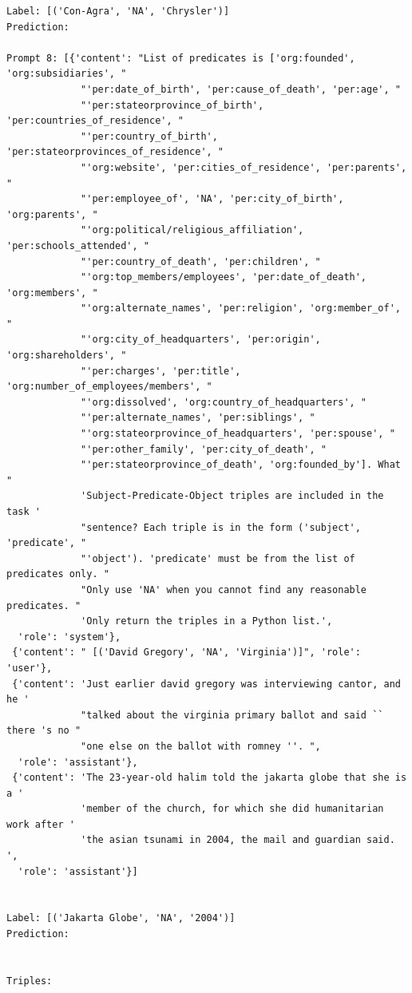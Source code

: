 \documentclass{article}
\begin{document}
\begin{lstlisting}
Label: [('Con-Agra', 'NA', 'Chrysler')]
Prediction: 

Prompt 8: [{'content': "List of predicates is ['org:founded', 'org:subsidiaries', "
             "'per:date_of_birth', 'per:cause_of_death', 'per:age', "
             "'per:stateorprovince_of_birth', 'per:countries_of_residence', "
             "'per:country_of_birth', 'per:stateorprovinces_of_residence', "
             "'org:website', 'per:cities_of_residence', 'per:parents', "
             "'per:employee_of', 'NA', 'per:city_of_birth', 'org:parents', "
             "'org:political/religious_affiliation', 'per:schools_attended', "
             "'per:country_of_death', 'per:children', "
             "'org:top_members/employees', 'per:date_of_death', 'org:members', "
             "'org:alternate_names', 'per:religion', 'org:member_of', "
             "'org:city_of_headquarters', 'per:origin', 'org:shareholders', "
             "'per:charges', 'per:title', 'org:number_of_employees/members', "
             "'org:dissolved', 'org:country_of_headquarters', "
             "'per:alternate_names', 'per:siblings', "
             "'org:stateorprovince_of_headquarters', 'per:spouse', "
             "'per:other_family', 'per:city_of_death', "
             "'per:stateorprovince_of_death', 'org:founded_by']. What "
             'Subject-Predicate-Object triples are included in the task '
             "sentence? Each triple is in the form ('subject', 'predicate', "
             "'object'). 'predicate' must be from the list of predicates only. "
             "Only use 'NA' when you cannot find any reasonable predicates. "
             'Only return the triples in a Python list.',
  'role': 'system'},
 {'content': " [('David Gregory', 'NA', 'Virginia')]", 'role': 'user'},
 {'content': 'Just earlier david gregory was interviewing cantor, and he '
             "talked about the virginia primary ballot and said `` there 's no "
             "one else on the ballot with romney ''. ",
  'role': 'assistant'},
 {'content': 'The 23-year-old halim told the jakarta globe that she is a '
             'member of the church, for which she did humanitarian work after '
             'the asian tsunami in 2004, the mail and guardian said. ',
  'role': 'assistant'}]


Label: [('Jakarta Globe', 'NA', '2004')]
Prediction: 


Triples:


\end{lstlisting}
\end{document}
